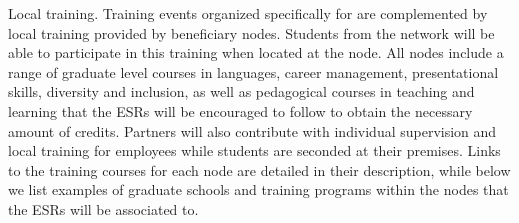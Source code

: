\noindent \color{blue}Local training. \color{black}
Training events organized specifically for \acronym are complemented by local training provided by beneficiary nodes. 
Students from the network will be able to participate in this training when located at the node. 
All nodes include a range of graduate level courses in languages, career management, presentational skills, diversity and inclusion, as  well as pedagogical courses in teaching and learning that the ESRs will be encouraged to follow to obtain the necessary amount of credits. 
Partners will also contribute with individual supervision and local training for employees while students are seconded at their premises. 
Links to the training courses for each node are detailed in their description, while below we list examples of graduate schools and training programs within the nodes that the ESRs will be associated to. 

